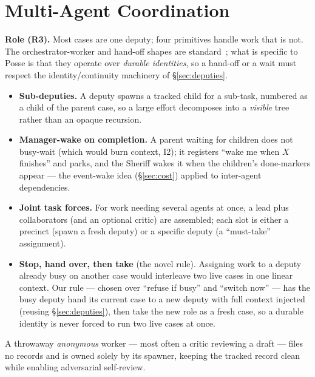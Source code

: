 \documentclass[10pt,twocolumn]{article}
\begin{document}
\section{Multi-Agent Coordination}
\label{sec:jtf}
\textbf{Role (R3).} Most cases are one deputy; four primitives handle work that is not.
The orchestrator-worker and hand-off shapes are standard~\cite{swarm,autogen}; what is
specific to Posse is that they operate over \emph{durable identities}, so a hand-off or a
wait must respect the identity/continuity machinery of \S\ref{sec:deputies}.
\begin{itemize}[leftmargin=1.1em,itemsep=1.5pt,topsep=2pt]
  \item \textbf{Sub-deputies.} A deputy spawns a tracked child for a sub-task, numbered as
  a child of the parent case, so a large effort decomposes into a \emph{visible} tree
  rather than an opaque recursion.
  \item \textbf{Manager-wake on completion.} A parent waiting for children does not
  busy-wait (which would burn context, I2); it registers ``wake me when $X$ finishes''
  and parks, and the Sheriff wakes it when the children's done-markers appear --- the
  event-wake idea (\S\ref{sec:cost}) applied to inter-agent dependencies.
  \item \textbf{Joint task forces.} For work needing several agents at once, a lead plus
  collaborators (and an optional critic) are assembled; each slot is either a precinct
  (spawn a fresh deputy) or a specific deputy (a ``must-take'' assignment).
  \item \textbf{Stop, hand over, then take} (the novel rule). Assigning work to a deputy
  already busy on another case would interleave two live cases in one linear context. Our
  rule --- chosen over ``refuse if busy'' and ``switch now'' --- has the busy deputy hand
  its current case to a new deputy with full context injected (reusing
  \S\ref{sec:deputies}), then take the new role as a fresh case, so a durable identity is
  never forced to run two live cases at once.
\end{itemize}
A throwaway \emph{anonymous} worker --- most often a critic reviewing a draft --- files no
records and is owned solely by its spawner, keeping the tracked record clean while
enabling adversarial self-review.

\end{document}
